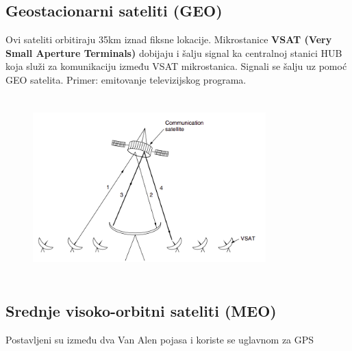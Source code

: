 \documentclass[a4paper]{article}
\begin{document}
        \subsection{Geostacionarni sateliti (GEO)}
            Ovi sateliti orbitiraju 35km iznad fiksne lokacije. Mikrostanice \textbf{VSAT (Very Small 
            Aperture Terminals)} dobijaju i šalju signal ka centralnoj stanici HUB koja služi 
            za komunikaciju između VSAT mikrostanica. Signali se šalju uz pomoć GEO satelita.
            Primer: emitovanje televizijskog programa.
            \begin{figure}[H]
                \begin{center}
                    \includegraphics[width=90mm,height=70mm]{Slike/geo.png}
                \end{center}
            \end{figure}
        \subsection{Srednje visoko-orbitni sateliti (MEO)}
            Postavljeni su između dva Van Alen pojasa i koriste se uglavnom za GPS
\end{document}
